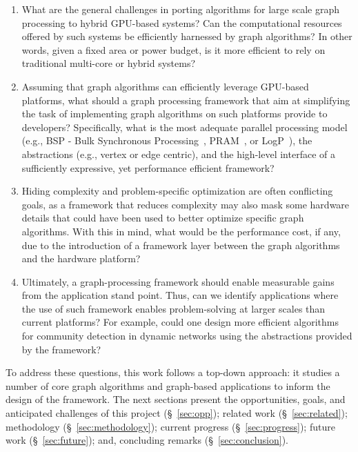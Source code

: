 \begin{enumerate}
\item What are the general challenges in porting algorithms for large scale graph processing to hybrid GPU-based systems? Can the computational resources offered by such systems be efficiently harnessed by graph algorithms? In other words, given a fixed area or power budget, is it more efficient to rely on traditional multi-core or hybrid systems?

\item Assuming that graph algorithms can efficiently leverage GPU-based platforms, what should a graph processing framework that aim at simplifying the task of implementing graph algorithms on such platforms provide to developers? Specifically, what is the most adequate parallel processing model (e.g., BSP - Bulk Synchronous Processing~\cite{Valiant1990}, PRAM~\cite{Fortune78}, or LogP~\cite{Culler1996}), the abstractions (e.g., vertex or edge centric), and the high-level interface of a sufficiently expressive, yet performance efficient framework? 

\item Hiding complexity and problem-specific optimization are often conflicting goals, as a framework that reduces complexity may also mask some hardware details that could have been used to better optimize specific graph algorithms. With this in mind, what would be the performance cost, if any, due to the introduction of a framework layer between the graph algorithms and the hardware platform? 

\item Ultimately, a graph-processing framework should enable measurable gains from the application stand point. Thus, can we identify applications where the use of such framework enables problem-solving at larger scales than current platforms? For example, could one design more efficient algorithms for community detection in dynamic networks using the abstractions provided by the framework?

\end{enumerate}

To address these questions, this work follows a top-down approach: it studies a number of core graph algorithms and graph-based applications to inform the design of the framework.
The next sections present the opportunities, goals, and anticipated challenges of this project (\S~\ref{sec:opp}); related work (\S~\ref{sec:related}); methodology (\S~\ref{sec:methodology}); current progress (\S~\ref{sec:progress}); future work (\S~\ref{sec:future}); and, concluding remarks (\S ~\ref{sec:conclusion}).

